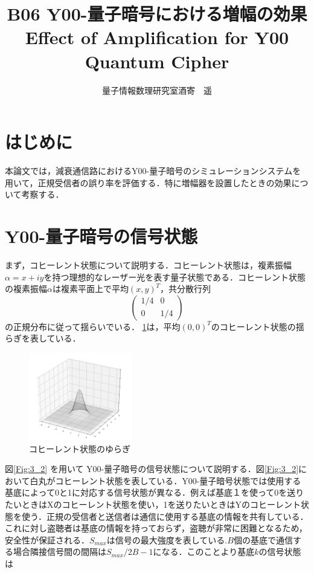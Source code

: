 \documentclass[a4j,twocolumn]{jarticle}
\title{\vspace{-2em}B06 Y00-量子暗号における増幅の効果\\
\vspace{0.5cm}
\normalsize{Effect of Amplification for Y00 Quantum Cipher}}
\date{}
\author{量子情報数理研究室\hspace{50mm}酒寄　遥}
\def \figref #1{\figurename\ref{#1}}
\begin{document}
\maketitle
\thispagestyle{empty}
\section{はじめに}
本論文では，減衰通信路におけるY00-量子暗号のシミュレーションシステムを用いて，正規受信者の誤り率を評価する．特に増幅器を設置したときの効果について考察する．
\section{Y00-量子暗号の信号状態}
まず，コヒーレント状態について説明する．コヒーレント状態は，複素振幅$\alpha=x+iy$を持つ理想的なレーザー光を表す量子状態である．コヒーレント状態の複素振幅$\alpha$は複素平面上で平均$(x,y)^T$，共分散行列 
\begin{equation}\label{eq1}
\begin{pmatrix}
1/4&0\\
0&1/4
\end{pmatrix}
\end{equation}
の正規分布に従って揺らいでいる．
\figref{Fig:3_1}は，平均$(0,0)^T$のコヒーレント状態の揺らぎを表している．

\begin{figure}[htbp]
        \centering   
        \includegraphics[width=0.4\textwidth]{img/zemi33.png}
        \caption[sample image (png)]{コヒーレント状態のゆらぎ}
        \label{Fig:3_1}
    \end{figure}
図\ref{Fig:3_2}
を用いて
Y00-量子暗号の信号状態について説明する．図\ref{Fig:3_2}において白丸がコヒーレント状態を表している．Y00-量子暗号状態では使用する基底によって0と1に対応する信号状態が異なる．例えば基底１を使って0を送りたいときはXのコヒーレント状態を使い，1を送りたいときはYのコヒーレント状態を使う．正規の受信者と送信者は通信に使用する基底の情報を共有している．これに対し盗聴者は基底の情報を持っておらず，盗聴が非常に困難となるため，安全性が保証される．$S_{max}$は信号の最大強度を表している.$B$個の基底で通信する場合隣接信号間の間隔は$S_{max}/2B-1$になる．このことより基底$k$の信号状態は
\end{document}
